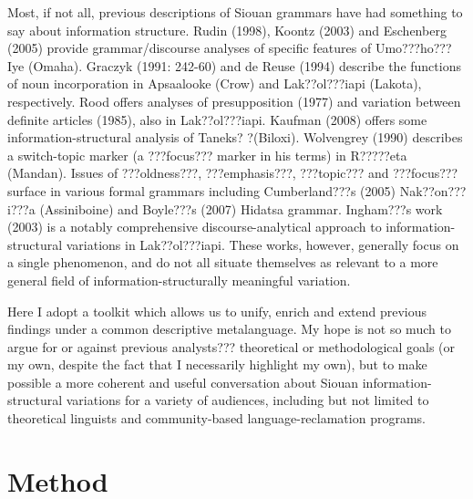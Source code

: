 \documentclass[output=paper]{LSP/langsci}
\begin{document}
	Most, if not all, previous descriptions of Siouan grammars have had something to say about information structure. Rudin (1998), Koontz (2003) and Eschenberg (2005) provide grammar/discourse analyses of specific features of Umo???ho??? Iye (Omaha). Graczyk (1991: 242-60) and de Reuse (1994) describe the functions of noun incorporation in Apsaalooke (Crow) and Lak??ol???iapi (Lakota), respectively. Rood offers analyses of presupposition (1977) and variation between definite articles (1985), also in Lak??ol???iapi. Kaufman (2008) offers some information-structural analysis of Taneks? ?(Biloxi). Wolvengrey (1990) describes a switch-topic marker (a ???focus??? marker in his terms) in R?????eta (Mandan). Issues of ???oldness???, ???emphasis???, ???topic??? and ???focus??? surface in various formal grammars including Cumberland???s (2005) Nak??on???i???a (Assiniboine) and Boyle???s (2007) Hidatsa grammar. Ingham???s work (2003) is a notably comprehensive discourse-analytical approach to information-structural variations in La\-k??ol\-???ia\-pi. These works, however, generally focus on a single phenomenon, and do not all situate themselves as relevant to a more general field of information-structurally meaningful variation. 
	
	Here I adopt a toolkit which allows us to unify, enrich and extend previous findings under a common descriptive metalanguage. My hope is not so much to argue for or against previous analysts??? theoretical or methodological goals (or my own, despite the fact that I necessarily highlight my own), but to make possible a more coherent and useful conversation about Siouan information-structural variations for a variety of audiences, including but not limited to theoretical linguists and community-based language-reclamation programs.

\section{Method}
\end{document}
